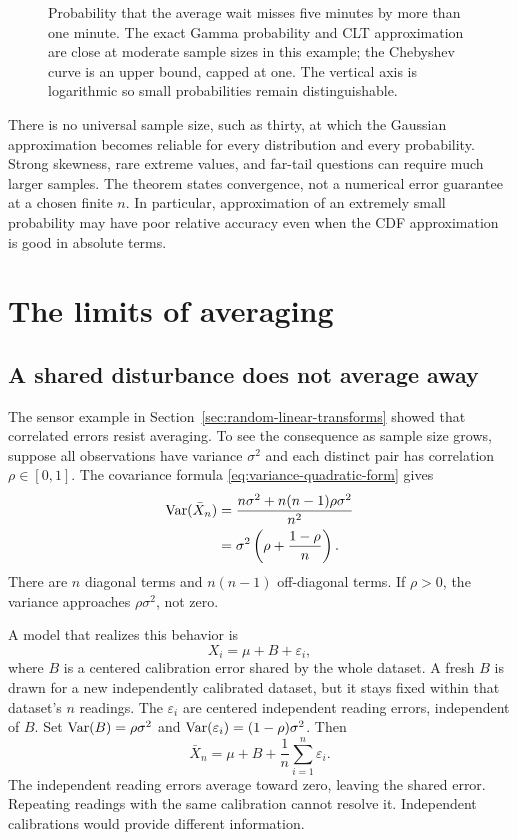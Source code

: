 \begin{figure}[H]
  \centering
  
  \caption{Probability that the average wait misses five minutes by
  more than one minute. The exact Gamma probability and CLT
  approximation are close at moderate sample sizes in this example;
  the Chebyshev curve is an upper bound, capped at one. The vertical
  axis is logarithmic so small probabilities remain distinguishable.}
  \label{fig:ch4-tails}
\end{figure}

There is no universal sample size, such as thirty, at which the
Gaussian approximation becomes reliable for every distribution and
every probability. Strong skewness, rare extreme values, and far-tail
questions can require much larger samples. The theorem states
convergence, not a numerical error guarantee at a chosen finite \(n\).
In particular, approximation of an extremely small probability may
have poor relative accuracy even when the CDF approximation is good
in absolute terms.

\section{The limits of averaging}
\label{sec:averaging-failures}

\subsection{A shared disturbance does not average away}

The sensor example in Section~\ref{sec:random-linear-transforms}
showed that correlated errors resist averaging. To see the consequence
as sample size grows, suppose all observations have variance
\(\sigma^2\) and each distinct pair has correlation
\(\rho\in[0,1]\). The covariance formula
\eqref{eq:variance-quadratic-form} gives
\begin{align}
  \operatorname{Var}(\bar X_n)
  &=\frac{n\sigma^2+n(n-1)\rho\sigma^2}{n^2}\notag\\
  &=\sigma^2\left(\rho+\frac{1-\rho}{n}\right).
  \label{eq:correlated-mean-variance}
\end{align}
There are \(n\) diagonal terms and \(n(n-1)\) off-diagonal terms.
If \(\rho>0\), the variance approaches \(\rho\sigma^2\), not zero.

A model that realizes this behavior is
\[
  X_i=\mu+B+\varepsilon_i,
\]
where \(B\) is a centered calibration error shared by the whole
dataset. A fresh \(B\) is drawn for a new independently calibrated
dataset, but it stays fixed within that dataset's \(n\) readings.
The \(\varepsilon_i\) are centered independent reading
errors, independent of \(B\). Set
\(\operatorname{Var}(B)=\rho\sigma^2\) and
\(\operatorname{Var}(\varepsilon_i)=(1-\rho)\sigma^2\). Then
\[
  \bar X_n=\mu+B+\frac1n\sum_{i=1}^n\varepsilon_i.
\]
The independent reading errors average toward zero, leaving the
shared error. Repeating readings with the same calibration cannot
resolve it. Independent calibrations would provide different information.

